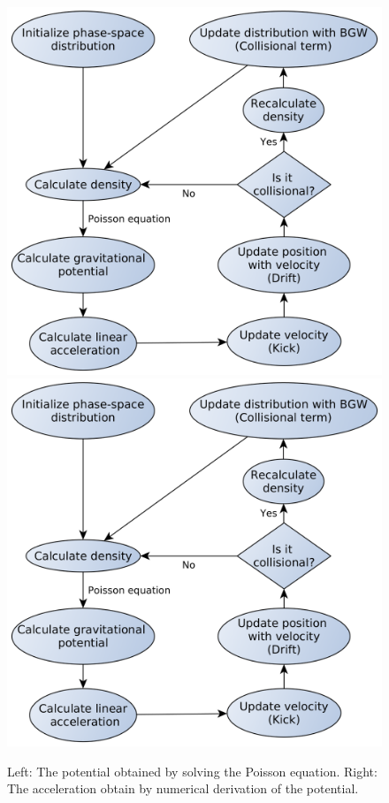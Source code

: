 \begin{figure}[ht!]
    \centering
    \includegraphics[scale=0.15]{imag/flowchart.png}
    \includegraphics[scale=0.15]{imag/flowchart.png}
    \caption{Left: The potential obtained by solving the Poisson equation. Right: The acceleration obtain by numerical derivation of the potential.}
    \label{1dInit2}
\end{figure}
















